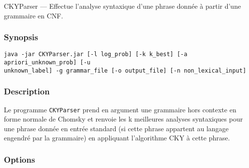 \documentclass[12pt]{article}
\begin{document}
CKYParser --- Effectue l'analyse syntaxique d'une phrase donn\'ee \`a partir d'une
grammaire en CNF.

\subsubsection{Synopsis}

{\ttfamily
\begin{verbatim}
java -jar CKYParser.jar [-l log_prob] [-k k_best] [-a apriori_unknown_prob] [-u
unknown_label] -g grammar_file [-o output_file] [-n non_lexical_input]
\end{verbatim}
}

\subsubsection{Description}

Le programme \texttt{CKYParser} prend en argument une grammaire hors contexte
en forme normale de Chomsky et renvoie les k meilleures analyses syntaxiques
pour une phrase donn\'ee en entr\'ee standard (si cette phrase appartent au langage
engendr\'e par la grammaire) en appliquant l'algorithme CKY \`a cette phrase.

\subsubsection{Options}
\end{document}
